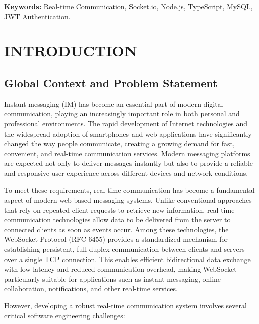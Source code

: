 \documentclass[12pt, a4paper]{article}
\begin{document}
\vspace{0.5cm}
\noindent \textbf{Keywords:} Real-time Communication, Socket.io, Node.js, TypeScript, MySQL, JWT Authentication.

\newpage


\section{INTRODUCTION}

\subsection{Global Context and Problem Statement}

Instant messaging (IM) has become an essential part of modern digital communication, playing an increasingly important role in both personal and professional environments. The rapid development of Internet technologies and the widespread adoption of smartphones and web applications have significantly changed the way people communicate, creating a growing demand for fast, convenient, and real-time communication services. Modern messaging platforms are expected not only to deliver messages instantly but also to provide a reliable and responsive user experience across different devices and network conditions.

To meet these requirements, real-time communication has become a fundamental aspect of modern web-based messaging systems. Unlike conventional approaches that rely on repeated client requests to retrieve new information, real-time communication technologies allow data to be delivered from the server to connected clients as soon as events occur. Among these technologies, the WebSocket Protocol (RFC 6455) provides a standardized mechanism for establishing persistent, full-duplex communication between clients and servers over a single TCP connection. This enables efficient bidirectional data exchange with low latency and reduced communication overhead, making WebSocket particularly suitable for applications such as instant messaging, online collaboration, notifications, and other real-time services.

However, developing a robust real-time communication system involves several critical software engineering challenges:
\end{document}
